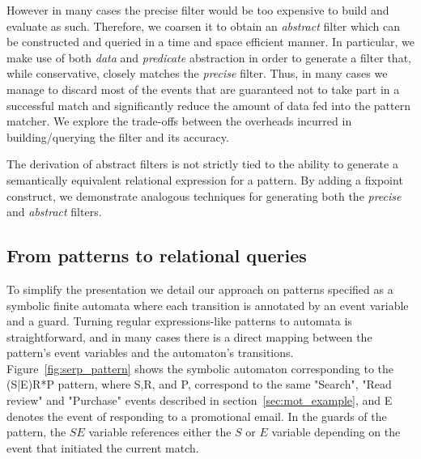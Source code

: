 However in many cases the precise filter would be too expensive to build and 
evaluate as such.
Therefore, we coarsen it to obtain an {\em abstract} filter
which can be constructed and queried in a time and space efficient manner.
In particular, we make use of both {\em data} and {\em predicate} 
abstraction in order to generate a filter that, while conservative, closely 
matches the {\em precise} filter. 
Thus, in many cases we manage to discard most of the events that are guaranteed 
not to take part in a successful match and significantly reduce the amount of 
data fed into the pattern matcher.
We explore the trade-offs between the overheads incurred in building/querying
the filter and its accuracy. 


The derivation of abstract filters is not strictly tied to the ability to 
generate a semantically equivalent relational expression for a pattern. 
By adding a fixpoint construct, we demonstrate analogous techniques for 
generating both the {\em precise} and {\em abstract} filters.

\subsection{From patterns to relational queries}

To simplify the presentation we detail our approach on patterns specified as a 
symbolic finite automata where each transition is annotated by an event 
variable and a guard.
Turning regular expressions-like patterns to automata is straightforward,
and in many cases there is a direct mapping between the pattern's event 
variables and the automaton's transitions.
Figure~\ref{fig:serp_pattern} shows the symbolic automaton corresponding to the 
(S|E)R*P pattern, where S,R, and P, correspond to the same "Search", "Read 
review" and "Purchase" events described in section~\ref{sec:mot_example}, and E 
denotes the event of responding to a promotional email.
In the guards of the pattern, the $SE$ variable references either the $S$ or 
$E$ variable depending on the event that initiated the current match. 


